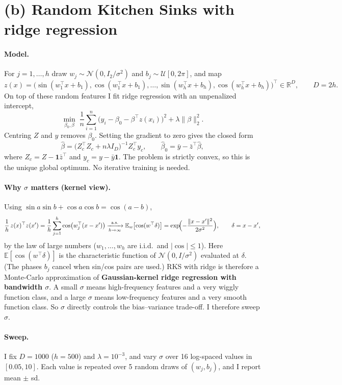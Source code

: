 \documentclass[11pt]{article}
\newcommand{\E}{\mathbb{E}}
\newcommand{\R}{\mathbb{R}}
\begin{document}
\section*{(b) Random Kitchen Sinks with ridge regression}

\paragraph{Model.} For $j=1,\dots,h$ draw $w_j\sim\mathcal N(0,I_2/\sigma^2)$ and
$b_j\sim\mathcal U[0,2\pi]$, and map
\[
 z(x)=\bigl(\sin(w_1^\top x+b_1),\cos(w_1^\top x+b_1),\dots,\sin(w_h^\top x+b_h),\cos(w_h^\top x+b_h)\bigr)^\top\in\R^{D},
 \qquad D=2h .
\]
On top of these random features I fit ridge regression with an unpenalized intercept,
\[
 \min_{\beta_0,\beta}\;\frac1n\sum_{i=1}^n\bigl(y_i-\beta_0-\beta^\top z(x_i)\bigr)^2+\lambda\lVert\beta\rVert_2^2 .
\]
Centring $Z$ and $y$ removes $\beta_0$. Setting the gradient to zero gives the closed form
\[
 \hat\beta=\bigl(Z_c^\top Z_c+n\lambda I_D\bigr)^{-1}Z_c^\top y_c,\qquad
 \hat\beta_0=\bar y-\bar z^\top\hat\beta ,
\]
where $Z_c=Z-\mathbf 1\bar z^\top$ and $y_c=y-\bar y\mathbf 1$. The problem is strictly convex,
so this is the unique global optimum. No iterative training is needed.

\paragraph{Why $\sigma$ matters (kernel view).} Using $\sin a\sin b+\cos a\cos b=\cos(a-b)$,
\[
 \frac1h\,z(x)^\top z(x')
 =\frac1h\sum_{j=1}^h\cos\bigl(w_j^\top(x-x')\bigr)
 \xrightarrow[h\to\infty]{\text{a.s.}}
 \E_w\bigl[\cos(w^\top\delta)\bigr]
 =\exp\!\Bigl(-\frac{\lVert x-x'\rVert^2}{2\sigma^2}\Bigr),
 \qquad\delta=x-x',
\]
by the law of large numbers ($w_1,\dots,w_h$ are i.i.d.\ and $|\cos|\le1$). Here
$\E[\cos(w^\top\delta)]$ is the characteristic function of $\mathcal N(0,I/\sigma^2)$
evaluated at $\delta$. (The phases $b_j$ cancel when sin/cos pairs are used.) RKS with ridge is
therefore a Monte-Carlo approximation of \textbf{Gaussian-kernel ridge regression with bandwidth
$\sigma$}. A small $\sigma$ means high-frequency features and a very wiggly function class, and a
large $\sigma$ means low-frequency features and a very smooth function class. So $\sigma$ directly
controls the bias--variance trade-off. I therefore sweep $\sigma$.

\paragraph{Sweep.} I fix $D=1000$ ($h=500$) and $\lambda=10^{-3}$, and vary $\sigma$ over 16
log-spaced values in $[0.05,10]$. Each value is repeated over 5 random draws of $(w_j,b_j)$, and I
report mean $\pm$ sd.
\end{document}
